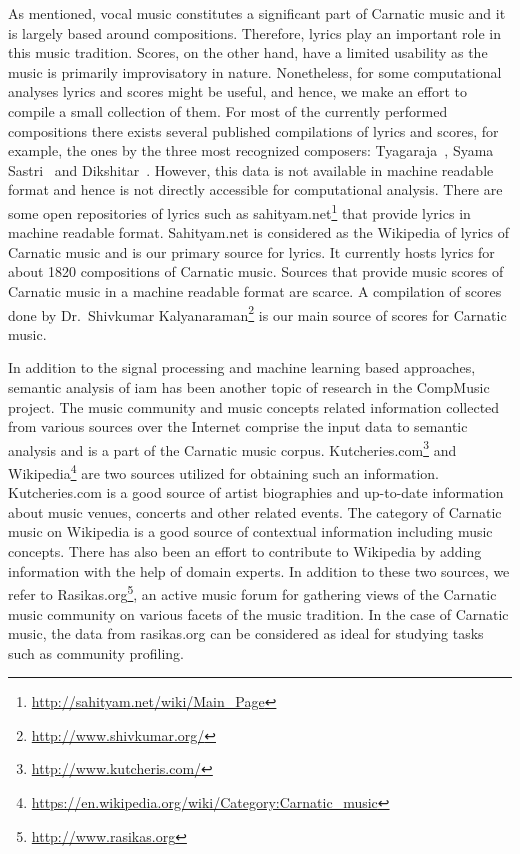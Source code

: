 As mentioned, vocal music constitutes a significant part of Carnatic music and it is largely based around compositions. Therefore, lyrics play an important role in this music tradition. Scores, on the other hand, have a limited usability as the music is primarily improvisatory in nature. Nonetheless, for some computational analyses lyrics and scores might be useful, and hence, we make an effort to compile a small collection of them. For most of the currently performed compositions there exists several published compilations of lyrics and scores, for example, the ones by the three most recognized composers: Tyagaraja~\citep{TKG_Rao_Tyagaraja}, Syama Sastri~\citep{TKG_Rao_syama} and Dikshitar~\citep{TKG_Rao_Muddusvami}. However, this data is not available in machine readable format and hence is not directly accessible for computational analysis. There are some open repositories of lyrics such as sahityam.net\footnote{\url{http://sahityam.net/wiki/Main_Page}} that provide lyrics in machine readable format. Sahityam.net is considered as the Wikipedia of lyrics of Carnatic music and is our primary source for lyrics. It currently hosts lyrics for about 1820 compositions of Carnatic music. Sources that provide music scores of Carnatic music in a machine readable format are scarce. A compilation of scores done by Dr.~Shivkumar Kalyanaraman\footnote{\url{http://www.shivkumar.org/}} is our main source of scores for Carnatic music.

In addition to the signal processing and machine learning based approaches, semantic analysis of \gls{iam} has been another topic of research in the CompMusic project. The music community and music concepts related information collected from various sources over the Internet comprise the input data to semantic analysis and is a part of the Carnatic music corpus. Kutcheries.com\footnote{\url{http://www.kutcheris.com/}} and Wikipedia\footnote{\url{https://en.wikipedia.org/wiki/Category:Carnatic_music}} are two sources utilized for obtaining such an information. Kutcheries.com is a good source of artist biographies and up-to-date information about music venues, concerts and other related events. The category of Carnatic music on Wikipedia is a good source of contextual information including music concepts. There has also been an effort to contribute to Wikipedia by adding information with the help of domain experts. In addition to these two sources, we refer to Rasikas.org\footnote{\url{http://www.rasikas.org}}, an active music forum for gathering views of the Carnatic music community on various facets of the music tradition. In the case of Carnatic music, the data from rasikas.org can be considered as ideal for studying tasks such as community profiling.


